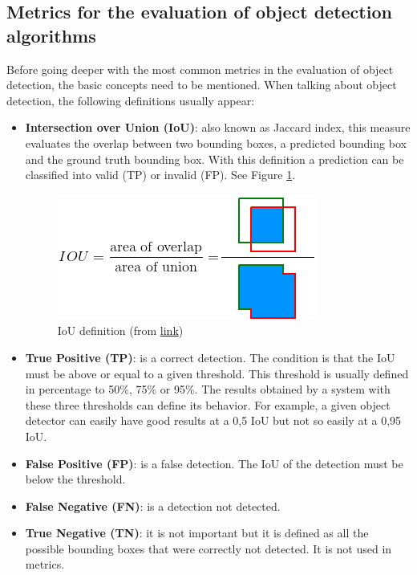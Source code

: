 \subsection{Metrics for the evaluation of object detection algorithms}
Before going deeper with the most common metrics in the evaluation of object detection, the basic concepts need to be mentioned. When talking about object detection, the following definitions usually appear:
\begin{itemize}
    \item \textbf{Intersection over Union (IoU)}: also known as Jaccard index, this measure evaluates the overlap between two bounding boxes, a predicted bounding box and the ground truth bounding box. With this definition a prediction can be classified into valid (TP) or invalid (FP). See Figure \ref{fig:iou}.
    \begin{figure}[H]
    \begin{center}
    \includegraphics[scale=0.5]{figures/iou.png}
    \caption{IoU definition (from \href{https://github.com/rafaelpadilla/Object-Detection-Metrics#intersection-over-union-iou}{link})}
    \label{fig:iou}
    \end{center}
    \end{figure}
    \item \textbf{True Positive (TP)}: is a correct detection. The condition is that the IoU must be above or equal to a given threshold. This threshold is usually defined in percentage to 50\%, 75\% or 95\%. The results obtained by a system with these three thresholds can define its behavior. For example, a given object detector can easily have good results at a 0,5 IoU but not so easily at a 0,95 IoU.
    \item \textbf{False Positive (FP)}: is a false detection. The IoU of the detection must be below the threshold.
    \item \textbf{False Negative (FN)}: is a detection not detected.
    \item \textbf{True Negative (TN)}: it is not important but it is defined as all the possible bounding boxes that were correctly not detected. It is not used in metrics.
\end{itemize}

